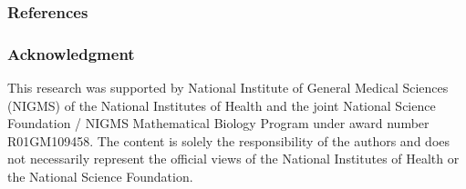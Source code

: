 \documentclass{beamer}
\begin{document}
\begin{frame}[allowframebreaks]
  \tiny
  \frametitle{References}
  
  
\end{frame}

\begin{frame}%
  \frametitle{Acknowledgment}
  \small%
  This research was supported by National Institute of General Medical Sciences (NIGMS) of the National Institutes of Health and the joint National Science Foundation / NIGMS Mathematical Biology Program under award number R01GM109458. The content is solely the responsibility of the authors and does not necessarily represent the official views of the National Institutes of Health or the National Science Foundation.
\end{frame}
\end{document}
